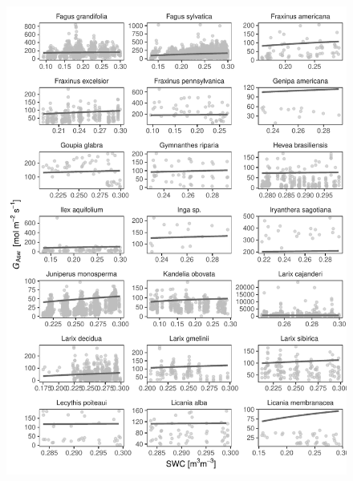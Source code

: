 \documentclass[11pt,twoside]{reedthesis}
\begin{document}
\begin{figure}[H]

{\centering \includegraphics[width=1\linewidth]{figure/appendixD/ggg11} 

}

\end{figure}
\end{document}
